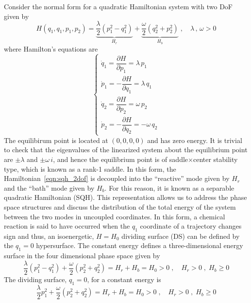 \documentclass{ws-ijbc}
\begin{document}
\label{sec:app_viz}


Consider the normal form for a quadratic Hamiltonian system with two DoF given by
% 
\begin{equation}
H(q_1, q_1, p_1, p_2) = \underbrace{\frac{\lambda}{2} (p_1^2 - q_1^2)}_\text{$H_r$} + 
\underbrace{\frac{\omega}{2}(q_2^2 + p^2_2)}_\text{$H_b$} \; ,
\quad \lambda \, , \, \omega > 0 
\label{eqn:sqh_2dof}
\end{equation}
where Hamilton's equations are
\begin{equation}
\begin{cases}
\dot{q}_1 = \dfrac{\partial H}{\partial p_1} = \lambda \, p_1 \\[.3cm]
\dot{p}_1 = - \dfrac{\partial H}{\partial q_1} = \lambda \, q_1 \\[.3cm]
\dot{q}_2 = \dfrac{\partial H}{\partial p_2} = \omega \, p_2 \\[.3cm]
\dot{p}_2 = -\dfrac{\partial H}{\partial q_2} = - \omega \, q_2 
\end{cases}
\label{eqn:eom_nf_2dof}
\end{equation}
The equilibirum point is located at $(0,0,0,0)$ and has zero energy. It is trivial to check that the eigenvalues of the linearized system about the equilibrium point are $\pm \lambda$ and $\pm \omega \, i$, and hence the equilibrium point is of saddle$\times$center stability type, which is known as a rank-1 saddle. In this form, the Hamiltonian~\eqref{eqn:sqh_2dof} is decoupled into the ``reactive'' mode given by $H_r$ and the ``bath'' mode given by $H_b$. For this reason, it is known as a separable quadratic Hamiltonian (SQH). This representation allows us to address the phase space structures and discuss the distribution of the total energy of the system between the two modes in uncoupled coordinates. In this form, a chemical reaction is said to have occurred when the $q_1$ coordinate of a trajectory changes sign and thus, an isoenergetic, $H = H_0$ dividing surface (DS) can be defined by the $q_1 = 0$ hypersurface. The constant energy defines a three-dimensional energy surface in the four dimensional phase space given by
%
\begin{equation}
\frac{\lambda}{2} \left(p_1^2 - q_1^2\right) + \frac{\omega}{2}\left(p_2^2 + q^2_2\right) = H_r + H_b = H_0 > 0 \; , \quad H_r > 0 \; , \; H_b \geq 0
\end{equation}
%
The dividing surface, $q_1 = 0$, for a constant energy is 
%
\begin{equation}
\frac{\lambda}{2} p_1^2 + \frac{\omega}{2}\left(p_2^2 + q^2_2\right) = H_r + H_b = H_0 > 0 \; , \quad H_r > 0 \; , \; H_b \geq 0 
\label{eqn:ds_sqh_2dof}
\end{equation}
\end{document}
